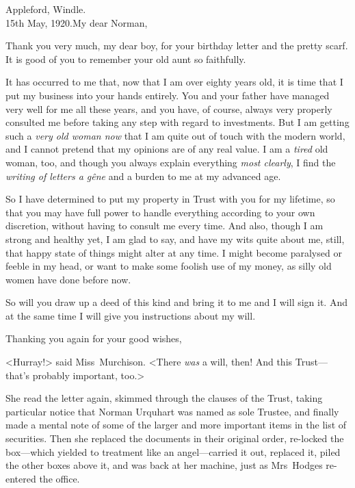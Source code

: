 \begin{letter}
	\enlargethispage{\baselineskip}
\end{letter}
\begin{mail}{Appleford, Windle.\\15th May, 1920.}{My dear Norman,}

Thank you very much, my dear boy, for your birthday letter and the pretty scarf. It is good of you to remember your old aunt so faithfully.

It has occurred to me that, now that I am over eighty years old, it is time that I put my business into your hands entirely. You and your father have managed very well for me all these years, and you have, of course, always very properly consulted me before taking any step with regard to investments. But I am getting such a \emph{very old woman now} that I am quite out of touch with the modern world, and I cannot pretend that my opinions are of any real value. I am a \emph{tired} old woman, too, and though you always explain everything \emph{most clearly}, I find the \emph{writing of letters a gêne} and a burden to me at my advanced age.

So I have determined to put my property in Trust with you for my lifetime, so that you may have full power to handle everything according to your own discretion, without having to consult me every time. And also, though I am strong and healthy yet, I am glad to say, and have my wits quite about me, still, that happy state of things might alter at any time. I might become paralysed or feeble in my head, or want to make some foolish use of my money, as silly old women have done before now.

So will you draw up a deed of this kind and bring it to me and I will sign it. And at the same time I will give you instructions about my will.

Thanking you again for your good wishes,

\end{mail}

<Hurray!> said Miss~Murchison. <There \emph{was} a will, then! And this Trust—that's probably important, too.>

She read the letter again, skimmed through the clauses of the Trust, taking particular notice that Norman Urquhart was named as sole Trustee, and finally made a mental note of some of the larger and more important items in the list of securities. Then she replaced the documents in their original order, re-locked the box—which yielded to treatment like an angel—carried it out, replaced it, piled the other boxes above it, and was back at her machine, just as Mrs~Hodges re-entered the office.

